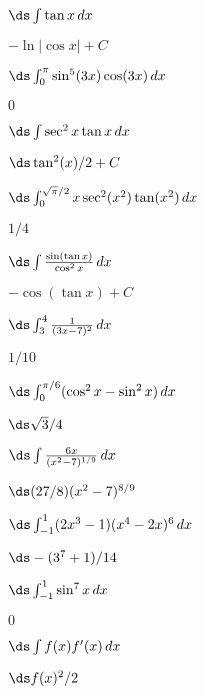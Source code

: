 \begin{exercises}
\exercise $\ds\int\tan x\,dx$
\begin{answer} $-\ln|\cos x|+C$
\end{answer}

\exercise  $\ds\int_0^\pi\sin^5(3x)\cos(3x)\,dx$
\begin{answer} $0$
\end{answer}

\exercise $\ds\int\sec^2x\tan x\,dx$
\begin{answer} $\ds \tan^2(x)/2+C$
\end{answer}

\exercise $\ds\int_0^{\sqrt{\pi}/2} x\sec^2(x^2)\tan(x^2)\,dx$
\begin{answer} $1/4$
\end{answer}

\exercise $\ds\int {\sin(\tan x)\over\cos^2x}\,dx$
\begin{answer} $-\cos(\tan x)+C$
\end{answer}

\exercise $\ds\int_3^4 {1\over(3x-7)^2}\,dx$
\begin{answer} $1/10$
\end{answer}

\exercise $\ds\int_0^{\pi/6}(\cos^2x - \sin^2x)\,dx$
\begin{answer} $\ds \sqrt3/4$
\end{answer}

\exercise $\ds\int {6x\over(x^2 - 7)^{1/9}}\,dx$
\begin{answer} $\ds (27/8)(x^2-7)^{8/9}$
\end{answer}

\exercise $\ds\int_{-1}^1 (2x^3-1)(x^4-2x)^6\,dx$
\begin{answer} $\ds -(3^7+1)/14$
\end{answer}

\exercise $\ds\int_{-1}^1 \sin^7 x\,dx$
\begin{answer} $0$
\end{answer}

\exercise $\ds\int f(x) f'(x)\,dx$ 
\begin{answer} $\ds f(x)^2/2$
\end{answer}

\endtwocol

\end{exercises}
